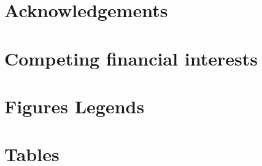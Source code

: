 \documentclass[english]{article}
\begin{document}
\section*{Acknowledgements}


\section*{Competing financial interests}


\section*{Figures Legends}


\section*{Tables}




\end{document}
